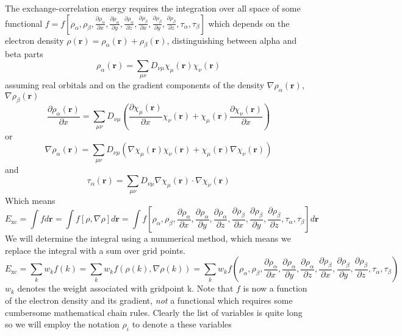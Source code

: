 \documentclass[preprint,preprintnumbers,amsmath,amssymb,11pt]{revtex4}
\def\xc{\textrm{xc}}
\begin{document}
The exchange-correlation energy requires the integration over all space of some
functional \mbox{$f=f[\rho_{\alpha},\rho_{\beta},\frac{\partial \rho_{\alpha}}{\partial x},\frac{\partial \rho_{\alpha}}{\partial y},\frac{\partial \rho_{\alpha}}{\partial z},\frac{\partial \rho_{\beta}}{\partial x},\frac{\partial \rho_{\beta}}{\partial y},\frac{\partial \rho_{\beta}}{\partial z},\tau_{\alpha},\tau_{\beta} ]$} which depends on the electron density $\rho(\textbf{r}) = \rho_{\alpha}(\textbf{r}) + \rho_{\beta}(\textbf{r})$, distinguishing between alpha and beta parts
\begin{equation}
\rho_{\alpha}(\textbf{r}) = \sum_{\mu \nu} D_{\nu \mu} \chi_{\mu}(\textbf{r}) \chi_{\nu}(\textbf{r})
\end{equation}
assuming real orbitals and on the gradient components of the density $ \nabla \rho_{\alpha}(\textbf{r})$,$\nabla \rho_{\beta}(\textbf{r})$
\begin{equation}
\frac{\partial \rho_{\alpha}(\textbf{r})}{\partial x} = \sum_{\mu \nu} D_{\nu \mu} \left( \frac{\partial \chi_{\mu}(\textbf{r})}{\partial x} \chi_{\nu}(\textbf{r}) + \chi_{\mu}(\textbf{r}) \frac{\partial \chi_{\nu}(\textbf{r})}{\partial x}  \right) 
\end{equation}
or
\begin{equation}
\nabla \rho_{\alpha}(\textbf{r}) = \sum_{\mu \nu} D_{\nu \mu} \left( \nabla \chi_{\mu}(\textbf{r}) \chi_{\nu}(\textbf{r}) + \chi_{\mu}(\textbf{r}) \nabla \chi_{\nu}(\textbf{r}) \right)
\end{equation}
and 
\begin{equation}
\tau_{\alpha}(\textbf{r}) = \sum_{\mu \nu} D_{\nu \mu} \nabla \chi_{\mu}(\textbf{r}) \cdot \nabla \chi_{\nu}(\textbf{r})
\end{equation}
Which means 
\begin{equation}\label{Exc}
E_{\xc}=\int f d\textbf{r} = \int f[\rho ,\nabla \rho]d\textbf{r} = \int 
f[\rho_{\alpha},\rho_{\beta},\frac{\partial \rho_{\alpha}}{\partial x},\frac{\partial \rho_{\alpha}}{\partial y},\frac{\partial \rho_{\alpha}}{\partial z},\frac{\partial \rho_{\beta}}{\partial x},\frac{\partial \rho_{\beta}}{\partial y},\frac{\partial \rho_{\beta}}{\partial z},\tau_{\alpha},\tau_{\beta} ] d\textbf{r}
\end{equation}
We will determine the integral using a nummerical method, which means we replace the integral with a sum over grid points.
\begin{equation}\label{Excgrid}
E_{\xc}=\sum_{k} w_{k} f(k) =\sum_{k} w_{k} f(\rho(k) ,\nabla \rho(k)) = \sum_{k} w_{k} f(\rho_{\alpha},\rho_{\beta},\frac{\partial \rho_{\alpha}}{\partial x},\frac{\partial \rho_{\alpha}}{\partial y},\frac{\partial \rho_{\alpha}}{\partial z},\frac{\partial \rho_{\beta}}{\partial x},\frac{\partial \rho_{\beta}}{\partial y},\frac{\partial \rho_{\beta}}{\partial z},\tau_{\alpha},\tau_{\beta})
\end{equation}
$w_{k}$ denotes the weight associated with gridpoint k. Note that $f$ is now a function of the electron density and its gradient, \emph{not} a functional which requires some cumbersome mathematical chain rules. Clearly the list of variables is quite long so we will employ the notation $\rho_{i}$ to denote a these variables
\end{document}
